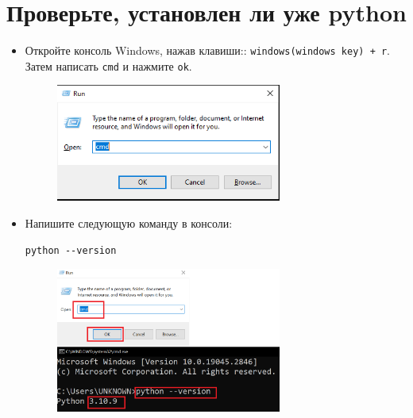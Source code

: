 \documentclass[12pt]{article}
\begin{document}
\setcounter{page}{1}%

\section{Проверьте, установлен ли уже python}\label{sec:check}
\begin{itemize}
	\item  {Откройте консоль Windows, нажав клавиши:: \texttt{windows(windows key) + r}. Затем написать \texttt{cmd} и нажмите \texttt{ok}.

	      \begin{figure}[H]
		      \centering
		      \includegraphics[width =0.7\textwidth ,keepaspectratio]{imgs/open_console.png}
		      \caption{}
	      \end{figure}
	      }

	\item  {Напишите следующую команду в консоли:

	      \begin{lstlisting}[caption=\phantom{},style=conlst,label={check_version}]
python --version
\end{lstlisting}

	      \begin{figure}[H]
		      \centering
		      \includegraphics[width =0.7\textwidth ,keepaspectratio]{imgs/check_python.png}
		      \caption{}
	      \end{figure}

	      }
\end{itemize}
\end{document}
